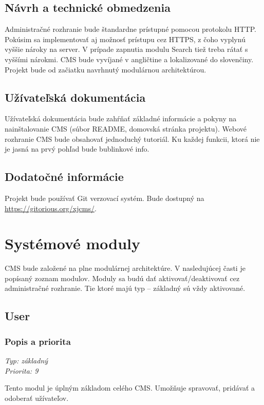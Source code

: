 \documentclass[a4paper,titlepage,11pt]{article}
\begin{document}
\subsection{Návrh a technické obmedzenia}
Administračné rozhranie bude štandardne prístupné pomocou protokolu HTTP. 
Pokúsim sa implementovať aj možnosť prístupu cez HTTPS, z čoho vyplynú vyššie nároky na server. 
V prípade zapnutia modulu Search tiež treba rátať s vyššími nárokmi.
CMS bude vyvíjané v angličtine a lokalizované do slovenčiny. Projekt bude od začiatku navrhnutý modulárnou architektúrou.

\subsection{Užívateľská dokumentácia}
Užívateľská dokumentácia bude zahŕňať základné informácie a pokyny na nainštalovanie CMS (súbor README, domovská stránka projektu). 
Webové rozhranie CMS bude obsahovať jednoduchý tutoriál. Ku každej funkcii, ktorá nie je jasná na prvý pohľad bude bublinkové info.

\subsection{Dodatočné informácie}
Projekt bude používať Git verzovací systém. Bude dostupný na \url{https://gitorious.org/xjcms/}.

\newpage
\section{Systémové moduly}
CMS bude založené na plne modulárnej architektúre. V nasledujúcej časti je popísaný zoznam modulov. 
Moduly sa budú dať aktivovať\slash deaktivovať cez administračné rozhranie. Tie ktoré majú typ -- základný sú vždy aktivované.

\subsection{User}
\subsubsection{Popis a priorita}
\begin{flushleft}
 \emph{Typ: základný}\\
 \emph{Priorita: 9}\\
\end{flushleft}
Tento modul je úplným základom celého CMS. Umožňuje spravovať, pridávať a odoberať užívateľov.
\end{document}
